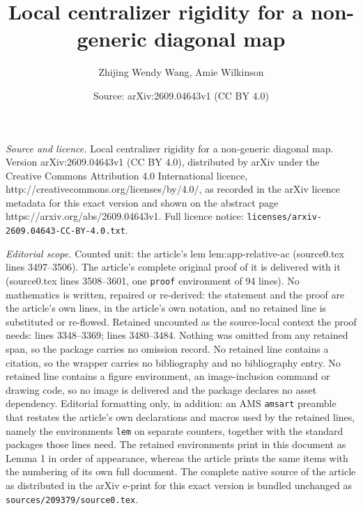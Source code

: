 \documentclass[10pt,a4paper]{amsart}
\title{Local centralizer rigidity for a non-generic diagonal map}
\author{Zhijing Wendy Wang, Amie Wilkinson}
\date{Source: arXiv:2609.04643v1 (CC BY 4.0)}
\begin{document}
\maketitle

\noindent\emph{Source and licence.} Local centralizer rigidity for a non-generic diagonal map. Version arXiv:2609.04643v1 (CC BY 4.0), distributed by arXiv under the Creative Commons Attribution 4.0 International licence, http://creativecommons.org/licenses/by/4.0/, as recorded in the arXiv licence metadata for this exact version and shown on the abstract page https://arxiv.org/abs/2609.04643v1. Full licence notice: \texttt{licenses/arxiv-2609.04643-CC-BY-4.0.txt}.\par\smallskip

\noindent\textit{Editorial scope.} Counted unit: the article's lem lem:app-relative-ac (source0.tex lines 3497--3506). The article's complete original proof of it is delivered with it (source0.tex lines 3508--3601, one \texttt{proof} environment of 94 lines). No mathematics is written, repaired or re-derived: the statement and the proof are the article's own lines, in the article's own notation, and no retained line is substituted or re-flowed.  Retained uncounted as the source-local context the proof needs: lines 3348--3369; lines 3480--3484.  Nothing was omitted from any retained span, so the package carries no omission record.  No retained line contains a citation, so the wrapper carries no bibliography and no bibliography entry.  No retained line contains a figure environment, an image-inclusion command or drawing code, so no image is delivered and the package declares no asset dependency.  Editorial formatting only, in addition: an AMS \texttt{amsart} preamble that restates the article's own declarations and macros used by the retained lines, namely the environments \texttt{lem} on separate counters, together with the standard packages those lines need.  The retained environments print in this document as Lemma 1 in order of appearance, whereas the article prints the same items with the numbering of its own full document.  The complete native source of the article as distributed in the arXiv e-print for this exact version is bundled unchanged as \texttt{sources/209379/source0.tex}.
\end{document}
